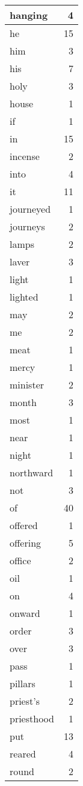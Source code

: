 \begin{center}
\begin{longtable}{l|r}
hanging & 4 \\ \hline
he & 15 \\ \hline
him & 3 \\ \hline
his & 7 \\ \hline
holy & 3 \\ \hline
house & 1 \\ \hline
if & 1 \\ \hline
in & 15 \\ \hline
incense & 2 \\ \hline
into & 4 \\ \hline
it & 11 \\ \hline
journeyed & 1 \\ \hline
journeys & 2 \\ \hline
lamps & 2 \\ \hline
laver & 3 \\ \hline
light & 1 \\ \hline
lighted & 1 \\ \hline
may & 2 \\ \hline
me & 2 \\ \hline
meat & 1 \\ \hline
mercy & 1 \\ \hline
minister & 2 \\ \hline
month & 3 \\ \hline
most & 1 \\ \hline
near & 1 \\ \hline
night & 1 \\ \hline
northward & 1 \\ \hline
not & 3 \\ \hline
of & 40 \\ \hline
offered & 1 \\ \hline
offering & 5 \\ \hline
office & 2 \\ \hline
oil & 1 \\ \hline
on & 4 \\ \hline
onward & 1 \\ \hline
order & 3 \\ \hline
over & 3 \\ \hline
pass & 1 \\ \hline
pillars & 1 \\ \hline
priest's & 2 \\ \hline
priesthood & 1 \\ \hline
put & 13 \\ \hline
reared & 4 \\ \hline
round & 2 \\ \hline

\end{longtable}
\end{center}
